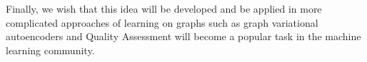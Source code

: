 \documentclass[12pt,twoside]{article}
\begin{document}
	Finally, we wish that this idea will be developed and be applied in more complicated approaches of learning on graphs such as
	graph variational autoencoders\cite{Kipf2016a} and Quality Assessment will become a popular task in the machine learning community.
	
	
	
	
	
	
	
	
	
\end{document}
